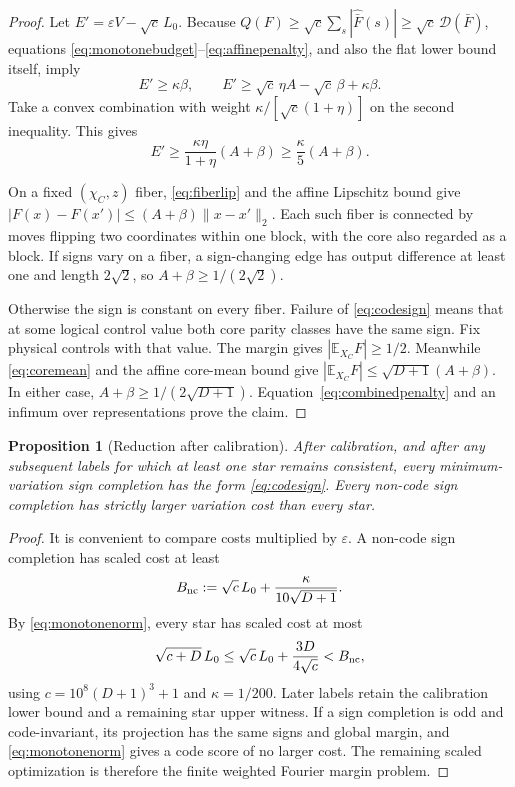 \documentclass[11pt]{article}
\newtheorem{proposition}[theorem]{Proposition}
\newcommand{\E}{\mathbb E}
\newcommand{\eps}{\varepsilon}
\begin{document}
\begin{proof}
Let $E'=\eps V-\sqrt c\,L_0$. Because
$Q(F)\ge\sqrt c\sum_s|\widehat{\bar F}(s)|
\ge\sqrt c\,\mathcal D(\bar F)$, equations
\eqref{eq:monotonebudget}--\eqref{eq:affinepenalty}, and also the
flat lower bound itself, imply
\[
 E'\ge\kappa\beta,
 \qquad E'\ge\sqrt c\,\eta A-\sqrt c\,\beta+\kappa\beta.
\]
Take a convex combination with weight
$\kappa/[\sqrt c(1+\eta)]$ on the second inequality. This gives
\begin{equation}\label{eq:combinedpenalty}
 E'\ge\frac{\kappa\eta}{1+\eta}(A+\beta)
       \ge\frac\kappa5(A+\beta).
\end{equation}

On a fixed $(\chi_C,z)$ fiber, \eqref{eq:fiberlip} and the affine
Lipschitz bound give
$|F(x)-F(x')|\le(A+\beta)\|x-x'\|_2$.
Each such fiber is connected by moves flipping two coordinates within
one block, with the core also regarded as a block. If signs vary on a
fiber, a sign-changing edge has output difference at least one and
length $2\sqrt2$, so $A+\beta\ge1/(2\sqrt2)$.

Otherwise the sign is constant on every fiber. Failure of
\eqref{eq:codesign} means that at some logical control value both core
parity classes have the same sign. Fix physical controls with that
value. The margin gives $|\E_{X_C}F|\ge1/2$. Meanwhile
\eqref{eq:coremean} and the affine core-mean bound give
$|\E_{X_C}F|\le\sqrt{D+1}(A+\beta)$. In either case,
$A+\beta\ge1/(2\sqrt{D+1})$. Equation~\eqref{eq:combinedpenalty}
and an infimum over representations prove the claim.
\end{proof}

\begin{proposition}[Reduction after calibration]\label{prop:codereduction}
After calibration, and after any subsequent labels for which at least
one star remains consistent, every minimum-variation sign completion
has the form \eqref{eq:codesign}. Every non-code sign completion has
strictly larger variation cost than every star.
\end{proposition}
\begin{proof}
It is convenient to compare costs multiplied by $\eps$. A non-code
sign completion has scaled cost at least
\begin{equation}\label{eq:noncodebarrier}
 B_{\rm nc}:=\sqrt c\,L_0+\frac{\kappa}{10\sqrt{D+1}}.
\end{equation}
By \eqref{eq:monotonenorm}, every star has scaled cost at most
\begin{equation}\label{eq:starupper}
 \sqrt{c+D}\,L_0
    \le\sqrt c\,L_0+\frac{3D}{4\sqrt c}<B_{\rm nc},
\end{equation}
using $c=10^8(D+1)^3+1$ and $\kappa=1/200$. Later labels retain the
calibration lower bound and a remaining star upper witness.
If a sign completion is odd and code-invariant, its projection has
the same signs and global margin, and \eqref{eq:monotonenorm} gives a
code score of no larger cost. The remaining scaled optimization is
therefore the finite weighted Fourier margin problem.
\end{proof}
\end{document}
